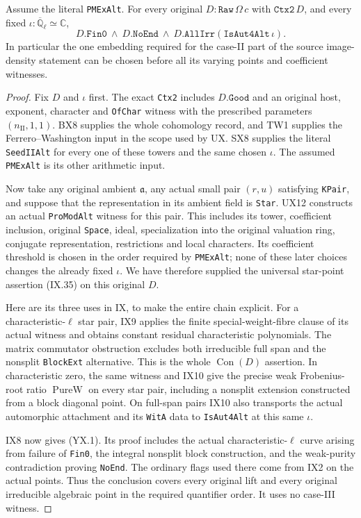 \begin{theorem}
\label{claim:YX1}
Assume the literal \texttt{PMExAlt}.  For every original
$D:\texttt{Raw}\,\Omega\,c$ with $\texttt{Ctx2}\,D$, and
every fixed $\iota:\overline{\mathbb Q}_\ell\simeq\mathbb C$,
\[
       D.\texttt{Fin0}\ \wedge\ D.\texttt{NoEnd}\ \wedge\
              D.\texttt{AllIrr}(\texttt{IsAut4Alt}\,\iota).
                                                               \tag{YX.1}
\]
In particular the one embedding required for the case-II part of
the source image-density statement can be chosen before all its
varying points and coefficient witnesses.
\end{theorem}
\begin{proof}
Fix $D$ and $\iota$ first.  The exact \texttt{Ctx2} includes
$D.\texttt{Good}$ and an original host, exponent, character and
\texttt{OfChar} witness with the prescribed parameters
$(n_{\mathrm{II}},1,1)$.  BX8 supplies the whole cohomology
record, and TW1 supplies the Ferrero--Washington input in the
scope used by UX.  SX8 supplies the literal \texttt{SeedIIAlt}
for every one of these towers and the same chosen $\iota$.
The assumed \texttt{PMExAlt} is its other arithmetic input.

Now take any original ambient $\mathfrak a$, any actual small
pair $(r,u)$ satisfying \texttt{KPair}, and suppose that the
representation in its ambient field is \texttt{Star}.
UX12 constructs an actual \texttt{ProModAlt} witness for this
pair.  This includes its tower, coefficient inclusion, original
\texttt{Space}, ideal, specialization into the original
valuation ring, conjugate representation, restrictions and local
characters.  Its coefficient threshold is chosen in the order
required by \texttt{PMExAlt}; none of these later choices changes
the already fixed $\iota$.
We have therefore supplied the universal star-point assertion
(IX.35) on this original $D$.

Here are its three uses in IX, to make the entire chain explicit.
For a characteristic-$\ell$ star pair, IX9 applies the finite
special-weight-fibre clause of its actual witness and obtains
constant residual characteristic polynomials.  The matrix
commutator obstruction excludes both irreducible full span and
the nonsplit \texttt{BlockExt} alternative.  This is the whole
$\operatorname{Con}(D)$ assertion.  In characteristic zero,
the same witness and IX10 give the precise weak Frobenius-root
ratio $\operatorname{PureW}$ on every star pair, including a
nonsplit extension constructed from a block diagonal point.
On full-span pairs IX10 also transports the actual automorphic
attachment and its \texttt{WitA} data to
\texttt{IsAut4Alt} at this same $\iota$.

IX8 now gives (YX.1).  Its proof includes the actual
characteristic-$\ell$ curve arising from failure of
\texttt{Fin0}, the integral nonsplit block construction, and
the weak-purity contradiction proving \texttt{NoEnd}.
The ordinary flags used there come from IX2 on the actual
points.  Thus the conclusion covers every original lift and
every original irreducible algebraic point in the required
quantifier order.  It uses no case-III witness.
\end{proof}

